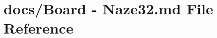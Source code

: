 \hypertarget{Board_01-_01Naze32_8md}{\section{docs/\+Board -\/ Naze32.\+md File Reference}
\label{Board_01-_01Naze32_8md}
}
